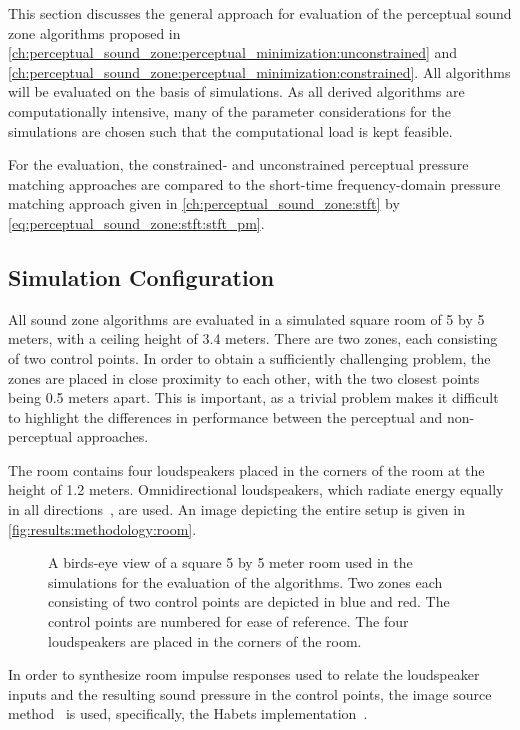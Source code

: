 This section discusses the general approach for evaluation of the perceptual sound zone algorithms proposed in 
\autoref{ch:perceptual_sound_zone:perceptual_minimization:unconstrained} and \autoref{ch:perceptual_sound_zone:perceptual_minimization:constrained}.
All algorithms will be evaluated on the basis of simulations. 
As all derived algorithms are computationally intensive, many of the parameter considerations 
for the simulations are chosen such that the computational load is kept feasible.

For the evaluation, the constrained- and unconstrained perceptual pressure matching approaches are compared to the 
short-time frequency-domain pressure matching approach
given in \autoref{ch:perceptual_sound_zone:stft} by \autoref{eq:perceptual_sound_zone:stft:stft_pm}.

\subsection{Simulation Configuration}
\label{ch:results:methodology:configuration}
All sound zone algorithms are evaluated in a simulated square room of 5 by 5 meters, with a ceiling height of 3.4 meters.
There are two zones, each consisting of two control points.
In order to obtain a sufficiently challenging problem, the zones are placed in close proximity to each other, 
with the two closest points being 0.5 meters apart.
This is important, as a trivial problem makes it difficult to highlight the differences in performance
between the perceptual and non-perceptual approaches.

The room contains four loudspeakers placed in the corners of the room at the height of 1.2 meters.
Omnidirectional loudspeakers, which radiate energy equally in all directions~\cite{habets2006room}, are used.
An image depicting the entire setup is given in \autoref{fig:results:methodology:room}.

\begin{figure}[]
    \centering
    \scalebox{1.0}{}
    \caption{A birds-eye view of a square 5 by 5 meter room used in the simulations for the evaluation of the algorithms.
    Two zones each consisting of two control points are depicted in blue and red.
    The control points are numbered for ease of reference.
    The four loudspeakers are placed in the corners of the room.}
    \label{fig:results:methodology:room}
\end{figure}

In order to synthesize room impulse responses used to relate the loudspeaker inputs and the resulting sound pressure 
in the control points, the image source method~\cite{allen1979image} is used, specifically, the Habets implementation~\cite{habets2006room}.

